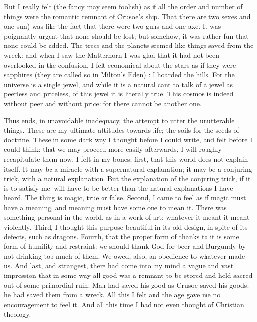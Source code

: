 \documentclass{book}
\begin{document}
But I really felt (the fancy may seem foolish) as if all the order and number of things were the romantic remnant of Crusoe’s ship. That there are two sexes and one sun) was like the fact that there were two guns and one axe. It was poignantly urgent that none should be lost; but somehow, it was rather fun that none could be added. The trees and the planets seemed like things saved from the wreck: and when I saw the Matterhorn I was glad that it had not been overlooked in the confusion. I felt economical about the stars as if they were sapphires (they are called so in Milton’s Eden) : I hoarded the hills. For the universe is a single jewel, and while it is a natural cant to talk of a jewel as peerless and priceless, of this jewel it is literally true. This cosmos is indeed without peer and without price: for there cannot be another one.

Thus ends, in unavoidable inadequacy, the attempt to utter the unutterable things. These are my ultimate attitudes towards life; the soils for the seeds of doctrine. These in some dark way I thought before I could write, and felt before I could think: that we may proceed more easily afterwards, I will roughly recapitulate them now. I felt in my bones; first, that this world does not explain itself. It may be a miracle with a supernatural explanation; it may be a conjuring trick, with a natural explanation. But the explanation of the conjuring trick, if it is to satisfy me, will have to be better than the natural explanations I have heard. The thing is magic, true or false. Second, I came to feel as if magic must have a meaning, and meaning must have some one to mean it. There was something personal in the world, as in a work of art; whatever it meant it meant violently. Third, I thought this purpose beautiful in its old design, in spite of its defects, such as dragons. Fourth, that the proper form of thanks to it is some form of humility and restraint: we should thank God for beer and Burgundy by not drinking too much of them. We owed, also, an obedience to whatever made us. And last, and strangest, there had come into my mind a vague and vast impression that in some way all good was a remnant to be stored and held sacred out of some primordial ruin. Man had saved his good as Crusoe saved his goods: he had saved them from a wreck. All this I felt and the age gave me no encouragement to feel it. And all this time I had not even thought of Christian theology.
\end{document}
